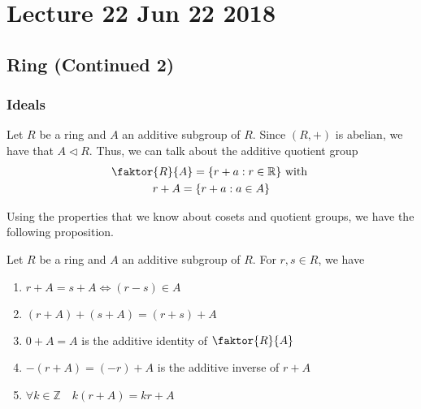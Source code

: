\chapter{Lecture 22 Jun 22 2018}%
\label{chp:lecture_22_jun_22_2018}

\section{Ring (Continued 2)}%
\label{sec:ring_continued_2}

\subsection{Ideals}%
\label{sub:ideals}

Let $R$ be a ring and $A$ an additive subgroup of $R$. Since $(R, +)$ is abelian, we have that $A \triangleleft R$. Thus, we can talk about the additive quotient group
\begin{gather*}
  \faktor{R}{A} = \{r + a : r \in \mathbb{R} \} \text{ with } \\
  r + A = \{ r + a : a \in A \}
\end{gather*}

Using the properties that we know about cosets and quotient groups, we have the following proposition.

\begin{propo}
\label{propo:properties_of_the_additive_quotient_group}
  Let $R$ be a ring and $A$ an additive subgroup of $R$. For $r, s \in R$, we have
  \begin{enumerate}
    \item $r + A = s + A \iff (r - s) \in A$
    \item $(r + A) + (s + A) = (r + s) + A$
    \item $0 + A = A$ is the additive identity of $\faktor{R}{A}$
    \item $- (r + A) = (-r) + A$ is the additive inverse of $r + A$
    \item $\forall k \in \mathbb{Z} \quad k(r + A) = kr + A$
  \end{enumerate}
\end{propo}

